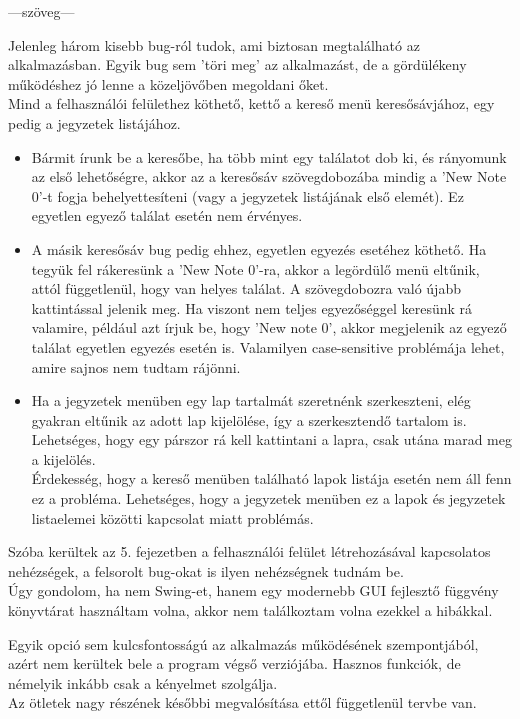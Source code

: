 
---szöveg---


Jelenleg három kisebb bug-ról tudok, ami biztosan megtalálható az alkalmazásban. Egyik bug sem 'töri meg' az alkalmazást, de a gördülékeny működéshez jó lenne a közeljövőben megoldani őket.
\\ Mind a felhasználói felülethez köthető, kettő a kereső menü keresősávjához, egy pedig a jegyzetek listájához.
\begin{itemize}
	\item Bármit írunk be a keresőbe, ha több mint egy találatot dob ki, és rányomunk az első lehetőségre, akkor az a keresősáv szövegdobozába mindig a 'New Note 0'-t fogja behelyettesíteni (vagy a jegyzetek listájának első elemét). Ez egyetlen egyező találat esetén nem érvényes.
	\item A másik keresősáv bug pedig ehhez, egyetlen egyezés esetéhez köthető. Ha tegyük fel rákeresünk a 'New Note 0'-ra, akkor a legördülő menü eltűnik, attól függetlenül, hogy van helyes találat. A szövegdobozra való újabb kattintással jelenik meg. Ha viszont nem teljes egyezőséggel keresünk rá valamire, például azt írjuk be, hogy 'New note 0', akkor megjelenik az egyező találat egyetlen egyezés esetén is. Valamilyen case-sensitive problémája lehet, amire sajnos nem tudtam rájönni.
	\item Ha a jegyzetek menüben egy lap tartalmát szeretnénk szerkeszteni, elég gyakran eltűnik az adott lap kijelölése, így a szerkesztendő tartalom is. Lehetséges, hogy egy párszor rá kell kattintani a lapra, csak utána marad meg a kijelölés.
	\\Érdekesség, hogy a kereső menüben található lapok listája esetén nem áll fenn ez a probléma. Lehetséges, hogy a jegyzetek menüben ez a lapok és jegyzetek listaelemei közötti kapcsolat miatt problémás.
	
\end{itemize}
\noindent Szóba kerültek az 5. fejezetben a felhasználói felület létrehozásával kapcsolatos nehézségek, a felsorolt bug-okat is ilyen nehézségnek tudnám be. 
\\Úgy gondolom, ha nem Swing-et, hanem egy modernebb GUI fejlesztő függvény könyvtárat használtam volna, akkor nem találkoztam volna ezekkel a hibákkal.


Egyik opció sem kulcsfontosságú az alkalmazás működésének szempontjából, azért nem kerültek bele a program végső verziójába. Hasznos funkciók, de némelyik inkább csak a kényelmet szolgálja.
\\Az ötletek nagy részének későbbi megvalósítása ettől függetlenül tervbe van.

